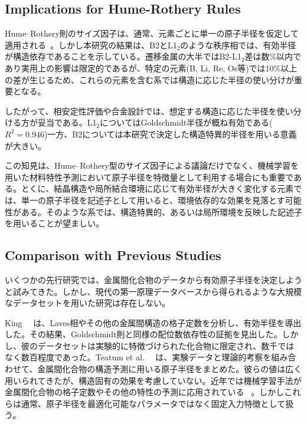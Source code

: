 \documentclass[a4paper,10pt,5p]{elsarticle}
\begin{document}

\subsection{Implications for Hume-Rothery Rules}
Hume--Rothery則のサイズ因子は、通常、元素ごとに単一の原子半径を仮定して適用される~\citep{humerothery1936, miracle2017}。しかし本研究の結果は、B2とL1$_2$のような秩序相では、有効半径が構造依存であることを示している。遷移金属の大半ではB2-L1$_2$差は数\%以内であり実用上の影響は限定的であるが、特定の元素(B, Li, Re, Os等)では10\%以上の差が生じるため、これらの元素を含む系では構造に応じた半径の使い分けが重要となる。

したがって、相安定性評価や合金設計では、想定する構造に応じた半径を使い分ける方が妥当である。L1$_2$についてはGoldschmidt半径が概ね有効である($R^2 = 0.946$)一方、B2については本研究で決定した構造特異的半径を用いる意義が大きい。

この知見は、Hume--Rothery型のサイズ因子による議論だけでなく、機械学習を用いた材料特性予測において原子半径を特徴量として利用する場合にも重要である。とくに、結晶構造や局所結合環境に応じて有効半径が大きく変化する元素では、単一の原子半径を記述子として用いると、環境依存的な効果を見落とす可能性がある。そのような系では、構造特異的、あるいは局所環境を反映した記述子を用いることが望ましい。


\subsection{Comparison with Previous Studies}

いくつかの先行研究では、金属間化合物のデータから有効原子半径を決定しようと試みてきた。しかし、現代の第一原理データベースから得られるような大規模なデータセットを用いた研究は存在しない。

King~~\citep{king1966} は、Laves相やその他の金属間構造の格子定数を分析し、有効半径を導出した。その結果、Goldschmidt則と同様の配位数依存性の証拠を見出した。しかし、彼のデータセットは実験的に特徴づけられた化合物に限定され、数千ではなく数百程度であった。Teatum et al.~~\citep{teatum1960} は、実験データと理論的考察を組み合わせて、金属間化合物の構造予測に用いる原子半径をまとめた。彼らの値は広く用いられてきたが、構造固有の効果を考慮していない。近年では機械学習手法が金属間化合物の格子定数やその他の特性の予測に応用されている ~\citep{ward2016}。しかしこれらは通常、原子半径を最適化可能なパラメータではなく固定入力特徴として扱う。
\end{document}
